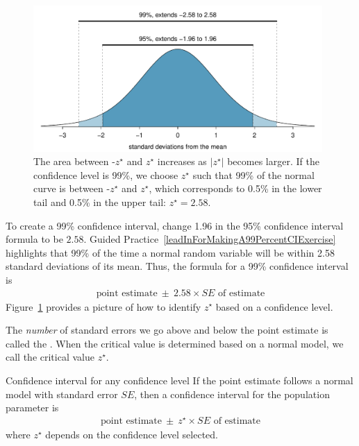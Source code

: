 \begin{figure}[ht]
\centering
\includegraphics[width=0.98\textwidth]{ch_foundations_for_inf/figures/choosingZForCI/choosingZForCI}
\caption{The area between -$z^{\star}$ and $z^{\star}$ increases as $|z^{\star}|$ becomes larger. If the confidence level is 99\%, we choose $z^{\star}$ such that 99\% of the normal curve is between -$z^{\star}$ and $z^{\star}$, which corresponds to 0.5\% in the lower tail and 0.5\% in the upper tail: $z^{\star}=2.58$.}
\label{choosingZForCI}
\end{figure}

\D{\newpage}

To create a 99\% confidence interval, change 1.96 in the 95\% confidence interval formula to be $2.58$. Guided Practice~\ref{leadInForMakingA99PercentCIExercise} highlights that 99\% of the time a normal random variable will be within 2.58 standard deviations of its mean. Thus, the formula for a 99\% confidence interval is
\begin{eqnarray}
\text{point estimate}\ \pm\ 2.58\times SE \text{ of estimate}
\label{99PercCIForMean}
\label{99PercCIForNormalPointEstimate}
\end{eqnarray}
Figure~\ref{choosingZForCI} provides a picture of how to identify $z^{\star}$ based on a confidence level. 

The \emph{number} of standard errors we go above and below the point estimate is called the .  When the critical value is determined based on a normal model, we call the critical value $z^{\star}$. 

\begin{onebox}{Confidence interval for any confidence level}
If the point estimate follows a normal model with standard error $SE$, then a confidence interval for the population parameter is
\begin{eqnarray*}
\text{point estimate}\ \pm\ z^{\star} \times SE \text{ of estimate}
\end{eqnarray*}
where $z^{\star}$ depends on the confidence level selected.\end{onebox}

